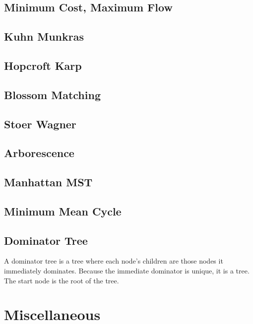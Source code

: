 \documentclass[10pt]{article}
\begin{document}
{\subsection{Minimum Cost, Maximum Flow}

\subsection{Kuhn Munkras}

\subsection{Hopcroft Karp}

\subsection{Blossom Matching}

\subsection{Stoer Wagner}

\subsection{Arborescence}

\subsection{Manhattan MST}

\subsection{Minimum Mean Cycle}

\subsection{Dominator Tree}
\noindent
A dominator tree is a tree where each node's children are those nodes it immediately dominates. Because the immediate dominator is unique, it is a tree. The start node is the root of the tree.

\section{Miscellaneous}
% 
}
\end{document}
